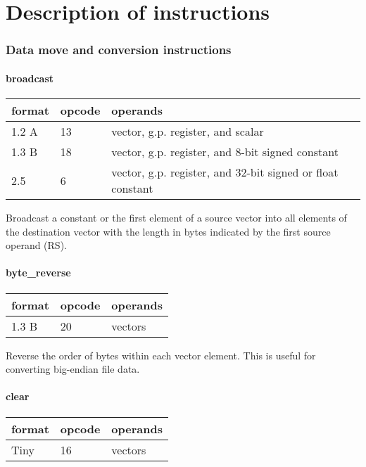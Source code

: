 \documentclass[forwardcom.tex]{subfiles}
\begin{document}
\RaggedRight

\chapter{Description of instructions}

\subsection{Data move and conversion instructions}

\subsubsection{broadcast}

\label{table:broadcastInstruction}
\begin{tabular}{|p{12mm}|p{12mm}|p{110mm}|}
\hline
\bfseries format & \bfseries opcode & \bfseries operands \\ \hline
1.2 A & 13 & vector, g.p. register, and scalar \\ \hline
1.3 B & 18 & vector, g.p. register, and 8-bit signed constant \\ \hline
2.5   &  6 & vector, g.p. register, and 32-bit signed or float constant \\ \hline
\end{tabular}
\vspace{2mm}

Broadcast a constant or the first element of a source vector into all
elements of the destination vector with the length in bytes indicated by the first source operand (RS).

\subsubsection{byte\_reverse}

\label{table:byteReverseInstruction}
\begin{tabular}{|p{12mm}|p{12mm}|p{110mm}|}
\hline
\bfseries format & \bfseries opcode & \bfseries operands \\ \hline
1.3 B & 20 & vectors \\ \hline
\end{tabular}
\vspace{2mm}

Reverse the order of bytes within each vector element. This is useful for converting big-endian file data.

\subsubsection{clear}
\label{table:clearInstruction}
\begin{tabular}{|p{12mm}|p{12mm}|p{110mm}|}
\hline
\bfseries format & \bfseries opcode & \bfseries operands \\ \hline
Tiny & 16 & vectors \\ \hline
\end{tabular}
\vspace{2mm}
\end{document}
